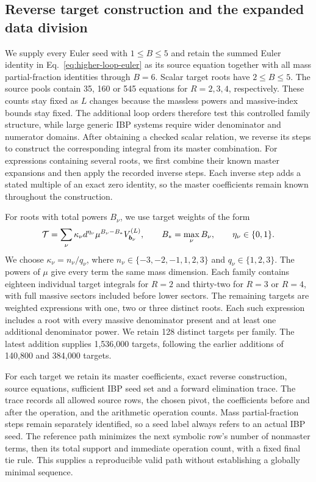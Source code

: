 \subsection{Reverse target construction and the expanded data division}
We supply every Euler seed with $1\leq B\leq5$ and retain the
summed Euler identity in Eq.~\eqref{eq:higher-loop-euler} as its
source equation together with all mass partial-fraction identities
through $B=6$. Scalar target roots have $2\leq B\leq5$.
The source pools contain 35, 160 or 545 equations for $R=2,3,4$,
respectively. These counts stay fixed as $L$ changes because the
massless powers and massive-index bounds stay fixed. The additional
loop orders therefore test this controlled family structure, while
large generic IBP systems require wider denominator and numerator
domains.
After obtaining a checked scalar relation, we reverse its steps to
construct the corresponding integral from its master combination.
For expressions containing several roots, we first combine their
known master expansions and then apply the recorded inverse steps.
Each inverse step adds a stated multiple of an exact zero identity,
so the master coefficients remain known throughout the construction.

For roots with total powers $B_\nu$, we use target weights of the form
\begin{equation}
 {\cal T}=\sum_\nu
   \kappa_\nu d^{\eta_\nu}\mu^{B_\nu-B_*}
                       V^{(L)}_{\boldsymbol b_\nu},
 \qquad
 B_*=\max_\nu B_\nu,\qquad \eta_\nu\in\{0,1\}.
 \label{eq:higher-loop-target-weights}
\end{equation}
We choose $\kappa_\nu=n_\nu/q_\nu$, where
$n_\nu\in\{-3,-2,-1,1,2,3\}$ and $q_\nu\in\{1,2,3\}$.
The powers of $\mu$ give every term the same mass dimension.
Each family contains eighteen individual target integrals for $R=2$
and thirty-two for $R=3$ or $R=4$, with full massive sectors included
before lower sectors. The remaining targets are weighted expressions
with one, two or three distinct roots. Each such expression includes
a root with every massive denominator present and at least one
additional denominator power. We retain 128 distinct targets
per family. The latest addition supplies 1,536,000 targets, following
the earlier additions of 140,800 and 384,000 targets.

For each target we retain its master coefficients, exact reverse
construction, source equations, sufficient IBP seed set and a
forward elimination trace. The trace records all allowed source
rows, the chosen pivot, the coefficients before and after the
operation, and the arithmetic operation counts. Mass
partial-fraction steps remain separately identified, so a seed label
always refers to an actual IBP seed. The reference path minimizes
the next symbolic row's number of nonmaster terms, then its total
support and immediate operation count, with a fixed final tie rule.
This supplies a reproducible valid path without establishing a
globally minimal sequence.

